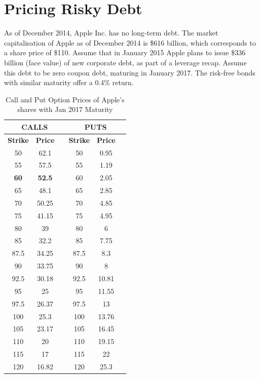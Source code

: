 \section{Pricing Risky Debt}


As of December 2014, Apple Inc. has no long-term debt. The market capitalisation of Apple as of December 2014 is \$616 billion, which corresponds to a share price of \$110. Assume that in January 2015 Apple plans to issue \$336 billion (face value) of new corporate debt, as part of a leverage recap. Assume this debt to be zero coupon debt, maturing in January 2017. The risk-free bonds with similar maturity offer a 0.4\% return.

\begin{table}[htbp]
    \centering
    \caption{Call and Put Option Prices of Apple's shares with Jan 2017 Maturity}
    \label{tab:option-prices}
    \begin{tabular}{ccc|ccc}
    \toprule
    \multicolumn{3}{c|}{CALLS} & \multicolumn{3}{c}{PUTS} \\ 
    \midrule
    \textbf{Strike} & \textbf{Price} & & \textbf{Strike} & \textbf{Price} & \\
    \midrule
    50  & 62.1  & & 50  & 0.95  & \\
    55  & 57.5  & & 55  & 1.19  & \\
    \textbf{60}  & \textbf{52.5 } & & 60  & 2.05  & \\
    65  & 48.1  & & 65  & 2.85  & \\
    70  & 50.25 & & 70  & 4.85  & \\
    75  & 41.15 & & 75  & 4.95  & \\
    80  & 39    & & 80  & 6     & \\
    85  & 32.2  & & 85  & 7.75  & \\
    87.5& 34.25 & & 87.5& 8.3   & \\
    90  & 33.75 & & 90  & 8     & \\
    92.5& 30.18 & & 92.5& 10.81 & \\
    95  & 25    & & 95  & 11.55 & \\
    97.5& 26.37 & & 97.5& 13    & \\
    100 & 25.3  & & 100 & 13.76 & \\
    105 & 23.17 & & 105 & 16.45 & \\
    110 & 20    & & 110 & 19.15 & \\
    115 & 17    & & 115 & 22    & \\
    120 & 16.82 & & 120 & 25.3  & \\

\end{tabular}
\end{table}
